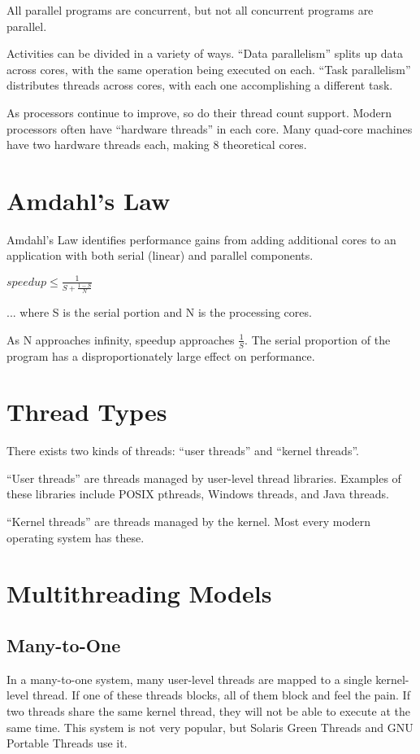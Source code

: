\documentclass{article}
\begin{document}
All parallel programs are concurrent, but not all concurrent programs are
parallel.

Activities can be divided in a variety of ways. ``Data parallelism'' splits up
data across cores, with the same operation being executed on each. ``Task
parallelism'' distributes threads across cores, with each one accomplishing a
different task.

As processors continue to improve, so do their thread count support. Modern
processors often have ``hardware threads'' in each core. Many quad-core
machines have two hardware threads each, making 8 theoretical cores.

\section{Amdahl's Law}
Amdahl's Law identifies performance gains from adding additional cores to an
application with both serial (linear) and parallel components.

$speedup \leq \frac{1}{S + \frac{1-S}{N}}$

... where S is the serial portion and N is the processing cores.

As N approaches infinity, speedup approaches $\frac{1}{S}$. The serial
proportion of the program has a disproportionately large effect on performance.

\section{Thread Types}
There exists two kinds of threads: ``user threads'' and ``kernel threads''.

``User threads'' are threads managed by user-level thread libraries. Examples
of these libraries include POSIX pthreads, Windows threads, and Java threads.

``Kernel threads'' are threads managed by the kernel. Most every modern
operating system has these.

\section{Multithreading Models}

\subsection{Many-to-One}
In a many-to-one system, many user-level threads are mapped to a single kernel-
level thread. If one of these threads blocks, all of them block and feel the
pain. If two threads share the same kernel thread, they will not be able to
execute at the same time. This system is not very popular, but Solaris Green
Threads and GNU Portable Threads use it.
\end{document}
